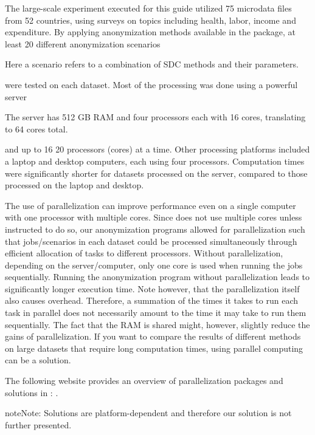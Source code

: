 \documentclass[letterpaper,10pt,english]{sphinxmanual}
\begin{document}
The large-scale experiment executed for this guide utilized 75 microdata
files from 52 countries, using surveys on topics including health,
labor, income and expenditure. By applying anonymization methods
available in the  package, at least 20 different anonymization
scenarios %
\begin{footnote}[7]\sphinxAtStartFootnote
Here a scenario refers to a combination of SDC methods and their
parameters.
%
\end{footnote} were tested on each dataset. Most of the
processing was done using a powerful server %
\begin{footnote}[8]\sphinxAtStartFootnote
The server has 512 GB RAM and four processors each with 16 cores,
translating to 64 cores total.
%
\end{footnote} and up
to 16 \textendash{} 20 processors (cores) at a time. Other processing platforms
included a laptop and desktop computers, each using four processors.
Computation times were significantly shorter for datasets processed on
the server, compared to those processed on the laptop and desktop.

The use of parallelization can improve performance even on a single
computer with one processor with multiple cores. Since  does not use
multiple cores unless instructed to do so, our anonymization programs
allowed for parallelization such that jobs/scenarios in each dataset
could be processed simultaneously through efficient allocation of tasks
to different processors. Without parallelization, depending on the
server/computer, only one core is used when running the jobs
sequentially. Running the anonymization program without parallelization
leads to significantly longer execution time. Note however, that the
parallelization itself also causes overhead. Therefore, a summation of
the times it takes to run each task in parallel does not necessarily
amount to the time it may take to run them sequentially. The fact that
the RAM is shared might, however, slightly reduce the gains of
parallelization. If you want to compare the results of different methods
on large datasets that require long computation times, using parallel
computing can be a solution. %
\begin{footnote}[9]\sphinxAtStartFootnote
The following website provides an overview of parallelization
packages and solutions in :
.

\begin{sphinxadmonition}{note}{Note:}
Solutions are platform-dependent and therefore our solution
is not further presented.
\end{sphinxadmonition}
%
\end{footnote}
\end{document}
